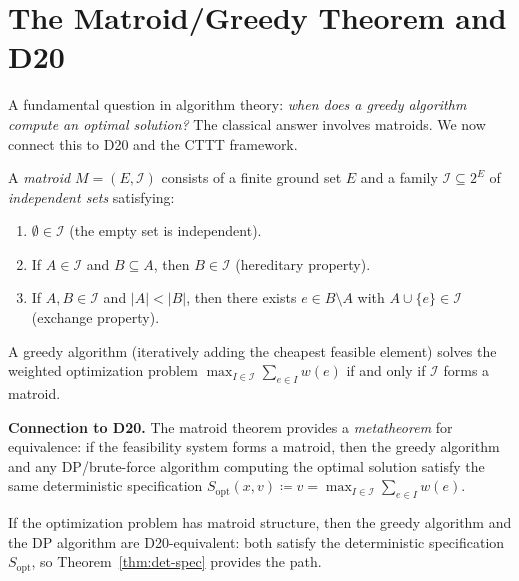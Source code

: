 
\section{The Matroid/Greedy Theorem and D20}
\label{sec:matroid-greedy}

A fundamental question in algorithm theory:
\emph{when does a greedy algorithm compute an optimal solution?}
The classical answer involves matroids.  We now connect this to
D20 and the CTTT framework.

\begin{definition}[Matroid]
A \emph{matroid} $M = (E, \mathcal{I})$ consists of a finite ground
set $E$ and a family $\mathcal{I} \subseteq 2^E$ of \emph{independent
sets} satisfying:
\begin{enumerate}
  \item $\emptyset \in \mathcal{I}$ (the empty set is independent).
  \item If $A \in \mathcal{I}$ and $B \subseteq A$, then
    $B \in \mathcal{I}$ (hereditary property).
  \item If $A, B \in \mathcal{I}$ and $|A| < |B|$, then there
    exists $e \in B \setminus A$ with $A \cup \{e\} \in \mathcal{I}$
    (exchange property).
\end{enumerate}
\end{definition}

\begin{theorem}
\label{thm:matroid-greedy}
A greedy algorithm (iteratively adding the cheapest feasible element)
solves the weighted optimization problem
$\max_{I \in \mathcal{I}} \sum_{e \in I} w(e)$
if and only if $\mathcal{I}$ forms a matroid.
\end{theorem}

\noindent\textbf{Connection to D20.}
The matroid theorem provides a \emph{metatheorem} for equivalence:
if the feasibility system forms a matroid, then the greedy algorithm
and any DP/brute-force algorithm computing the optimal solution
satisfy the same deterministic specification $S_{\mathrm{opt}}(x, v)
\coloneqq v = \max_{I \in \mathcal{I}} \sum_{e \in I} w(e)$.

\begin{corollary}
\label{cor:greedy-dp}
If the optimization problem has matroid structure, then the greedy
algorithm and the DP algorithm are D20-equivalent: both satisfy the
deterministic specification $S_{\mathrm{opt}}$, so
Theorem~\ref{thm:det-spec} provides the path.
\end{corollary}

